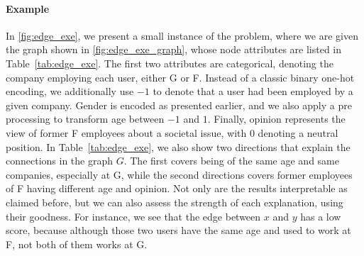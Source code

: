 \paragraph{Example}

In \autoref{fig:edge_exe}, we present a small instance of the \ecp{} problem, where we are given the
graph shown in \autoref{fig:edge_exe_graph}, whose node attributes are listed
in Table~\ref{tab:edge_exe}. The first two attributes are categorical, denoting the company employing
each user, either \textsf{G} or \textsf{F}. Instead of a classic binary one-hot encoding, we
additionally use $-1$ to denote that a user had been employed by a given company. \textsf{Gender} is
encoded as presented earlier, and we also apply a pre processing to transform \textsf{age} between
$-1$ and $1$. Finally, \textsf{opinion} represents the view of former \textsf{F} employees about a
societal issue, with $0$ denoting a neutral position. In Table~\ref{tab:edge_exe}, we also show two
directions that explain the connections in the graph $G$. The first covers being of the same age and
same companies, especially at \textsf{G}, while the second directions covers former employees of
\textsf{F} having different \textsf{age} and \textsf{opinion}. Not only are the results
interpretable as claimed before, but we can also assess the strength of each explanation, using
their goodness. For instance, we see that the edge between $x$ and $y$ has a low score, because
although those two users have the same \textsf{age} and used to work at \textsf{F}, not both of them
works at \textsf{G}.

